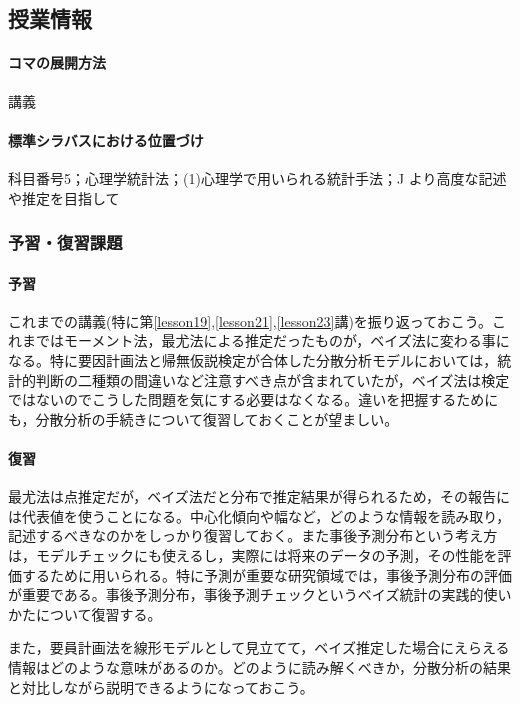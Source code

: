 \subsection{授業情報}
\paragraph{コマの展開方法}
講義
\paragraph{標準シラバスにおける位置づけ}
科目番号5；心理学統計法；(1)心理学で用いられる統計手法；J より高度な記述や推定を目指して
\subsubsection{予習・復習課題}
\paragraph{予習}
これまでの講義(特に第\ref{lesson19},\ref{lesson21},\ref{lesson23}講)を振り返っておこう。これまではモーメント法，最尤法による推定だったものが，ベイズ法に変わる事になる。特に要因計画法と帰無仮説検定が合体した分散分析モデルにおいては，統計的判断の二種類の間違いなど注意すべき点が含まれていたが，ベイズ法は検定ではないのでこうした問題を気にする必要はなくなる。違いを把握するためにも，分散分析の手続きについて復習しておくことが望ましい。
\paragraph{復習}
最尤法は点推定だが，ベイズ法だと分布で推定結果が得られるため，その報告には代表値を使うことになる。中心化傾向や幅など，どのような情報を読み取り，記述するべきなのかをしっかり復習しておく。また事後予測分布という考え方は，モデルチェックにも使えるし，実際には将来のデータの予測，その性能を評価するために用いられる。特に予測が重要な研究領域では，事後予測分布の評価が重要である。事後予測分布，事後予測チェックというベイズ統計の実践的使いかたについて復習する。

また，要員計画法を線形モデルとして見立てて，ベイズ推定した場合にえらえる情報はどのような意味があるのか。どのように読み解くべきか，分散分析の結果と対比しながら説明できるようになっておこう。